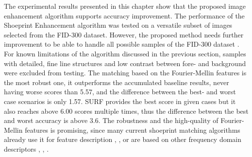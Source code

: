 \documentclass[draft,final]{vutinfth} %
\begin{document}
\par
The experimental results presented in this chapter show that the proposed image enhancement algorithm supports accuracy improvement.
The performance of the Shoeprint Enhancement  algorithm was tested on a versatile subset of images selected from the FID-300 dataset.
However, the proposed method needs further improvement to be able to handle all possible samples of the FID-300 dataset .
For known limitations of the algorithm discussed in the previous section, samples with detailed, fine line structures and low contrast between fore- and background were excluded from testing.
The matching based on the Fourier-Mellin features is the most robust one, it outperforms the accumulated baseline results, never having worse scores than 5.57, and the difference between the best- and worst case scenarios is only 1.57.
SURF provides the best score in given cases but it also reaches above 6.00 scores multiple times, thus the difference between the best and worst accuracy is above 3.6.
The robustness and the high-quality of Fourier-Mellin features is promising, since many current shoeprint matching algorithms already use it for feature description  \cite{gueham2008automatic}, \cite{richetelli2017classification}, \cite{wu2019crime} or are based on other frequency domain descriptors \cite{algarni2008novel}, \cite{wang2014automatic}, \cite{katireddy2017novel}. 

\end{document}
